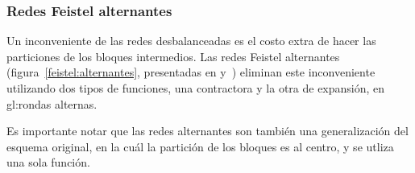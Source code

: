 %
%

\subsubsection{Redes Feistel alternantes}
\label{sec:red_feistel_alternante}

Un inconveniente de las redes desbalanceadas es el costo extra de hacer las
particiones de los bloques intermedios. Las redes Feistel alternantes
(figura~\ref{feistel:alternantes}, presentadas en
\cite{DBLP:conf/fse/AndersonB96a} y~\cite{DBLP:conf/fse/Lucks96}) eliminan
este inconveniente utilizando dos tipos de funciones, una contractora y la
otra de expansión, en \glspl{gl:ronda} alternas.

Es importante notar que las redes alternantes son también una generalización
del esquema original, en la cuál la partición de los bloques es al centro, y
se utliza una sola función.
